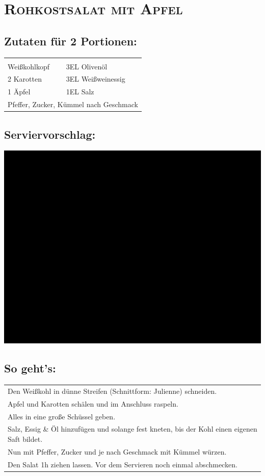 \section{\textsc{Rohkostsalat mit Apfel}}

\subsection*{Zutaten für 2 Portionen:}

\begin{tabular}{p{7.5cm} p{7.5cm}}
	& \\
	\sfrac{1}{2} Weißkohlkopf & 3EL Olivenöl \\
	2 Karotten & 3EL Weißweinessig \\
	1 Äpfel & 1EL Salz \\
	\multicolumn{2}{l}{Pfeffer, Zucker, Kümmel nach Geschmack}
\end{tabular}

\subsection*{Serviervorschlag:}

\includegraphics[width=\textwidth]{img/ph.jpg} \cite{rohkostapfel}

\subsection*{So geht's:}
\begin{tabular}{p{15cm}}
	\\
	Den Weißkohl in dünne Streifen (Schnittform: Julienne) schneiden.\\
	Apfel und Karotten schälen und im Anschluss raspeln.\\
  Alles in eine große Schüssel geben.\\
	Salz, Essig \& Öl hinzufügen und solange fest kneten, bis der Kohl einen eigenen Saft bildet.\\
	Nun mit Pfeffer, Zucker und je nach Geschmack mit Kümmel würzen.\\
	Den Salat 1h ziehen lassen. Vor dem Servieren noch einmal abschmecken.
\end{tabular}
